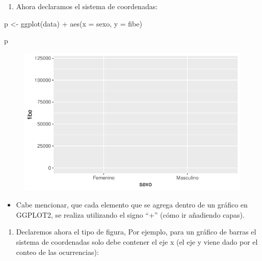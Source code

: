 \documentclass[
  letterpaper,
  DIV=11,
  numbers=noendperiod]{scrartcl}
\newenvironment{Shaded}{\begin{snugshade}}{\end{snugshade}}
\newcommand{\AttributeTok}[1]{\textcolor[rgb]{0.40,0.45,0.13}{#1}}
\newcommand{\FunctionTok}[1]{\textcolor[rgb]{0.28,0.35,0.67}{#1}}
\newcommand{\NormalTok}[1]{\textcolor[rgb]{0.00,0.23,0.31}{#1}}
\newcommand{\OtherTok}[1]{\textcolor[rgb]{0.00,0.23,0.31}{#1}}
\newcommand{\SpecialCharTok}[1]{\textcolor[rgb]{0.37,0.37,0.37}{#1}}
\providecommand{\tightlist}{%
  \setlength{\itemsep}{0pt}\setlength{\parskip}{0pt}}\usepackage{longtable,booktabs,array}
\begin{document}
\begin{enumerate}
\def\labelenumi{\arabic{enumi}.}
\setcounter{enumi}{1}
\tightlist
\item
  Ahora declaramos el sistema de coordenadas:
\end{enumerate}

\begin{Shaded}
\begin{Highlighting}[]
\NormalTok{p }\OtherTok{\textless{}{-}} \FunctionTok{ggplot}\NormalTok{(data) }\SpecialCharTok{+} \FunctionTok{aes}\NormalTok{(}\AttributeTok{x =}\NormalTok{ sexo, }\AttributeTok{y =}\NormalTok{ fibe)}

\NormalTok{p}
\end{Highlighting}
\end{Shaded}

\begin{figure}[H]

{\centering \includegraphics{notebook_visualization_files/figure-pdf/unnamed-chunk-2-1.pdf}

}

\end{figure}

\begin{itemize}
\tightlist
\item
  Cabe mencionar, que cada elemento que se agrega dentro de un gráfico
  en GGPLOT2, se realiza utilizando el signo ``+'' (cómo ir añadiendo
  capas).
\end{itemize}

\begin{enumerate}
\def\labelenumi{\arabic{enumi}.}
\setcounter{enumi}{2}
\tightlist
\item
  Declaremos ahora el tipo de figura, Por ejemplo, para un gráfico de
  barras el sistema de coordenadas solo debe contener el eje x (el eje y
  viene dado por el conteo de las ocurrencias):
\end{enumerate}
\end{document}
